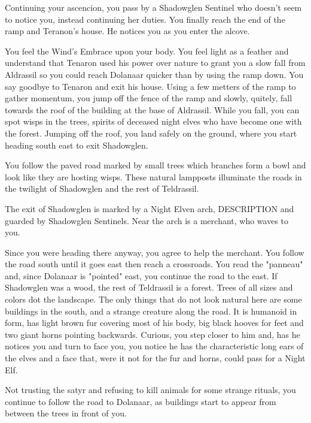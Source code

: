 
Continuing your ascencion, you pass by a Shadowglen Sentinel who doesn't seem to notice you, instead continuing her duties. You finally reach the end of the ramp and Teranon's house. He notices you as you enter the alcove.






You feel the Wind's Embrace upon your body. You feel light as a feather and understand that Tenaron used his power over nature to grant you a slow fall from Aldrassil so you could reach Dolanaar quicker than by using the ramp down. You say goodbye to Tenaron and exit his house. Using a few metters of the ramp to gather momentum, you jump off the fence of the ramp and slowly, quitely, fall towards the roof of the building at the base of Aldrassil. While you fall, you can spot wisps in the trees, spirits of deceased night elves who have become one with the forest. Jumping off the roof, you land safely on the ground, where you start heading south east to exit Shadowglen.

You follow the paved road marked by small trees which branches form a bowl and look like they are hosting wisps. These natural lampposts illuminate the roads in the twilight of Shadowglen and the rest of Teldrassil.

The exit of Shadowglen is marked by a Night Elven arch, DESCRIPTION and guarded by Shadowglen Sentinels. Near the arch is a merchant, who waves to you.


Since you were heading there anyway, you agree to help the merchant. You follow the road south until it goes east then reach a crossroads. You read the "panneau" and, since Dolanaar is "pointed" east, you continue the road to the east. If Shadowglen was a wood, the rest of Teldrassil is a forest. Trees of all sizes and colors dot the landscape. The only things that do not look natural here are some buildings in the south, and a strange creature along the road. It is humanoid in form, has light brown fur covering most of his body, big black hooves for feet and two giant horns pointing backwards. Curious, you step closer to him and, has he notices you and turn to face you, you notice he has the characteristic long ears of the elves and a face that, were it not for the fur and horns, could pass for a Night Elf.



Not trusting the satyr and refusing to kill animals for some strange rituals, you continue to follow the road to Dolanaar, as buildings start to appear from between the trees in front of you.

